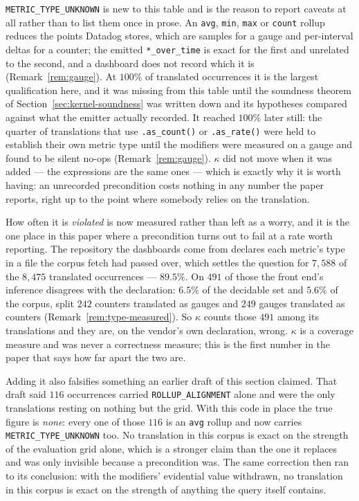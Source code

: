 \begin{remark}\label{rem:type-caveat}
\texttt{METRIC\_TYPE\_UNKNOWN} is new to this table and is the reason to report caveats at
all rather than to list them once in prose. An \texttt{avg}, \texttt{min}, \texttt{max} or
\texttt{count} rollup reduces the points Datadog stores, which are samples for a gauge and
per-interval deltas for a counter; the emitted \texttt{*\_over\_time} is exact for the
first and unrelated to the second, and a dashboard does not record which it is
(Remark~\ref{rem:gauge}). At $100\%$ of translated occurrences it is the largest
qualification here, and it was missing from this table until the soundness theorem of
Section~\ref{sec:kernel-soundness} was written down and its hypotheses compared against
what the emitter actually recorded. It reached $100\%$ later still: the quarter of
translations that use \texttt{.as\_count()} or \texttt{.as\_rate()} were held to
establish their own metric type until the modifiers were measured on a gauge and found to
be silent no-ops (Remark~\ref{rem:gauge}). $\kappa$ did not move when it was added --- the
expressions are the same ones --- which is exactly why it is worth having: an unrecorded
precondition costs nothing in any number the paper reports, right up to the point where
somebody relies on the translation.

How often it is \emph{violated} is now measured rather than left as a worry, and it is
the one place in this paper where a precondition turns out to fail at a rate worth
reporting. The repository the dashboards come from declares each metric's type in a
file the corpus fetch had passed over, which settles the question for $7{,}588$ of the
$8{,}475$ translated occurrences --- $89.5\%$. On $491$ of those the front end's
inference disagrees with the declaration: $6.5\%$ of the decidable set and $5.6\%$ of
the corpus, split $242$ counters translated as gauges and $249$ gauges translated as
counters (Remark~\ref{rem:type-measured}). So $\kappa$ counts those $491$ among its
translations and they are, on the vendor's own declaration, wrong. $\kappa$ is a
coverage measure and was never a correctness measure; this is the first number in the
paper that says how far apart the two are.

Adding it also falsifies something an earlier draft of this section claimed. That draft
said $116$ occurrences carried \texttt{ROLLUP\_ALIGNMENT} alone and were the only
translations resting on nothing but the grid. With this code in place the true
figure is \emph{none}: every one of those $116$ is an \texttt{avg} rollup and now carries
\texttt{METRIC\_TYPE\_UNKNOWN} too. No translation in this corpus is exact on the strength
of the evaluation grid alone, which is a stronger claim than the one it replaces and was
only invisible because a precondition was. The same correction then ran to its conclusion:
with the modifiers' evidential value withdrawn, no translation in this corpus is exact on
the strength of anything the query itself contains.
\end{remark}
